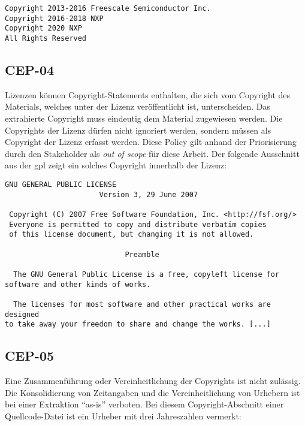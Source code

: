 \begin{lstlisting}[keepspaces=true]
Copyright 2013-2016 Freescale Semiconductor Inc.
Copyright 2016-2018 NXP
Copyright 2020 NXP
All Rights Reserved
\end{lstlisting}


\subsection{CEP-04}\label{subsec:cep-04}

Lizenzen können Copyright-Statements enthalten, die sich vom Copyright des Materials, welches unter der Lizenz veröffentlicht ist, unterscheiden.
Das extrahierte Copyright muss eindeutig dem Material zugewiesen werden.
Die Copyrights der Lizenz dürfen nicht ignoriert werden, sondern müssen als Copyright der Lizenz erfasst werden.
Diese Policy gilt anhand der Priorisierung durch den Stakeholder als \textit{out of scope} für diese Arbeit.
Der folgende Ausschnitt aus der \gls{gpl} zeigt ein solches Copyright innerhalb der Lizenz:

\begin{lstlisting}[keepspaces=true]
                    GNU GENERAL PUBLIC LICENSE
                      Version 3, 29 June 2007

 Copyright (C) 2007 Free Software Foundation, Inc. <http://fsf.org/>
 Everyone is permitted to copy and distribute verbatim copies
 of this license document, but changing it is not allowed.

                            Preamble

  The GNU General Public License is a free, copyleft license for
software and other kinds of works.

  The licenses for most software and other practical works are designed
to take away your freedom to share and change the works. [...]
\end{lstlisting}


\subsection{CEP-05}\label{subsec:cep-05}

Eine Zusammenführung oder Vereinheitlichung der Copyrights ist nicht zulässig.
Die Konsolidierung von Zeitangaben und die Vereinheitlichung von Urhebern ist bei einer Extraktion \enquote{as-is} verboten.
Bei diesem Copyright-Abschnitt einer Quellcode-Datei ist ein Urheber mit drei Jahreszahlen vermerkt:

